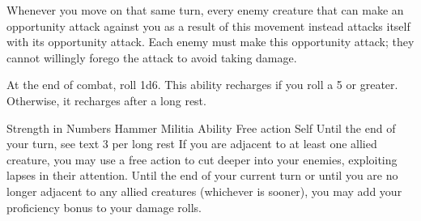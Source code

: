 Whenever you move on that same turn,
every enemy creature that can make an opportunity attack
against you as a result of this movement
instead attacks itself with its opportunity attack.
Each enemy must make this opportunity attack;
they cannot willingly forego the attack to
avoid taking damage.

At the end of combat, roll 1d6.
This ability recharges if you roll a 5 or greater.
Otherwise, it recharges after a long rest.


\ability%
    {Strength in Numbers}
    {Hammer Militia Ability}
    {Free action}
    {Self}
    {Until the end of your turn, see text}
    {3 per long rest}
If you are adjacent to at least one allied creature,
you may use a free action to cut deeper into your enemies,
exploiting lapses in their attention.
Until the end of your current turn
or until you are no longer adjacent to any allied creatures
(whichever is sooner),
you may add your proficiency bonus to your damage rolls.


